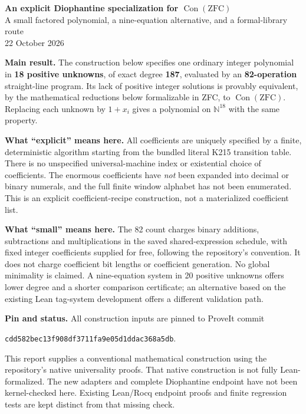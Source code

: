 \documentclass[10pt]{article}
\newcommand{\code}[1]{\texttt{#1}}
\newcommand{\NN}{\mathbb N}\newcommand{\ZZ}{\mathbb Z}
\newcommand{\Con}{\operatorname{Con}}
\begin{document}
\begin{center}{\Large\bfseries An explicit Diophantine specialization for $\Con(\mathrm{ZFC})$}\\[5pt]
A small factored polynomial, a nine-equation alternative, and a formal-library route\\22 October 2026\end{center}

\textbf{Main result.} The construction below specifies one ordinary integer polynomial in \textbf{18 positive unknowns}, of exact degree \textbf{187}, evaluated by an \textbf{82-operation} straight-line program. Its lack of positive integer solutions is provably equivalent, by the mathematical reductions below formalizable in ZFC, to $\Con(\mathrm{ZFC})$. Replacing each unknown by $1+x_i$ gives a polynomial on $\NN^{18}$ with the same property.

\textbf{What ``explicit'' means here.} All coefficients are uniquely specified by a finite, deterministic algorithm starting from the bundled literal K215 transition table. There is no unspecified universal-machine index or existential choice of coefficients. The enormous coefficients have \emph{not} been expanded into decimal or binary numerals, and the full finite window alphabet has not been enumerated. This is an explicit coefficient-recipe construction, not a materialized coefficient list.

\textbf{What ``small'' means here.} The 82 count charges binary additions, subtractions and multiplications in the saved shared-expression schedule, with fixed integer coefficients supplied for free, following the repository's convention. It does not charge coefficient bit lengths or coefficient generation. No global minimality is claimed. A nine-equation system in 20 positive unknowns offers lower degree and a shorter comparison certificate; an alternative based on the existing Lean tag-system development offers a different validation path.

\textbf{Pin and status.} All construction inputs are pinned to ProveIt commit\par
\code{cdd582bec13f908df3711fa9e05d1ddac368a5db}.\par This report supplies a conventional mathematical construction using the repository's native universality proofs. That native construction is not fully Lean-formalized. The new adapters and complete Diophantine endpoint have not been kernel-checked here. Existing Lean/Rocq endpoint proofs and finite regression tests are kept distinct from that missing check.
\end{document}
